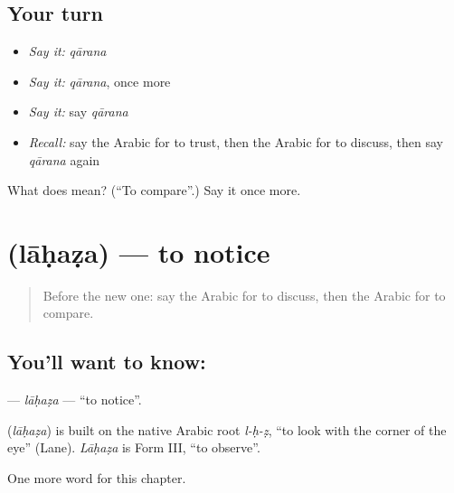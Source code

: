 \subsection*{Your turn}
\begin{itemize}
\raggedright
  \item \emph{Say it:} \emph{qārana}
  \item \emph{Say it:} \emph{qārana}, once more
  \item \emph{Say it:} say \emph{qārana}
  \item \emph{Recall:} say the Arabic for to trust, then the Arabic for to discuss, then say \emph{qārana} again
\end{itemize}

\begin{tcolorbox}[breakable,colback=teal!4,colframe=teal!35!black,title={Before you move on}]
What does  mean? (\textquotedblleft{}To compare\textquotedblright{}.) Say it once more.
\end{tcolorbox}
\section[\texorpdfstring{\ar{لاحظ} (lāḥaẓa)}{لاحظ (lāḥaẓa)}]{ (lāḥaẓa) — to notice}

\label{lesson:AR-C197-lahaza}



\begin{quote}
Before the new one: say the Arabic for to discuss, then the Arabic for to compare.
\end{quote}

\subsection*{You'll want to know: }
\textbf{} — \emph{lāḥaẓa} — \textquotedblleft{}to notice\textquotedblright{}.

\begin{cousinweb}
\textbf{} (\emph{lāḥaẓa}) is built on the native Arabic root \emph{l-ḥ-ẓ}, \textquotedblleft{}to look with the corner of the eye\textquotedblright{} (Lane). \emph{Lāḥaẓa} is Form III, \textquotedblleft{}to observe\textquotedblright{}.
\end{cousinweb}

\begin{grammarlens}[title={What you've built}]
One more word for this chapter.
\end{grammarlens}

